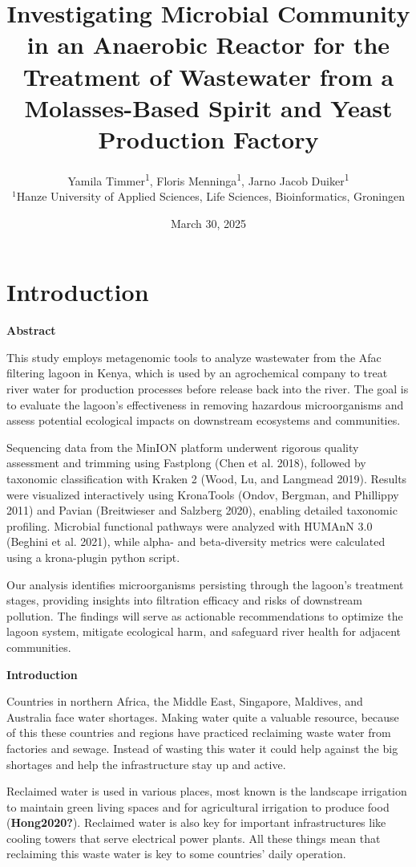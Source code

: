 \documentclass[
]{article}
\title{Investigating Microbial Community in an Anaerobic Reactor for the
Treatment of Wastewater from a Molasses-Based Spirit and Yeast
Production Factory}
\author{Yamila Timmer\textsuperscript{1}, Floris
Menninga\textsuperscript{1}, Jarno Jacob Duiker\textsuperscript{1}\\
\(^1\)Hanze University of Applied Sciences, Life Sciences,
Bioinformatics, Groningen}
\date{March 30, 2025}
\begin{document}
\maketitle

{
\setcounter{tocdepth}{2}
\tableofcontents
}
\hypertarget{introduction}{%
\section{Introduction}\label{introduction}}

\textbf{Abstract}

This study employs metagenomic tools to analyze wastewater from the Afac
filtering lagoon in Kenya, which is used by an agrochemical company to
treat river water for production processes before release back into the
river. The goal is to evaluate the lagoon's effectiveness in removing
hazardous microorganisms and assess potential ecological impacts on
downstream ecosystems and communities.

Sequencing data from the MinION platform underwent rigorous quality
assessment and trimming using Fastplong (Chen et al. 2018), followed by
taxonomic classification with Kraken 2 (Wood, Lu, and Langmead 2019).
Results were visualized interactively using KronaTools (Ondov, Bergman,
and Phillippy 2011) and Pavian (Breitwieser and Salzberg 2020), enabling
detailed taxonomic profiling. Microbial functional pathways were
analyzed with HUMAnN 3.0 (Beghini et al. 2021), while alpha- and
beta-diversity metrics were calculated using a krona-plugin python
script.

Our analysis identifies microorganisms persisting through the lagoon's
treatment stages, providing insights into filtration efficacy and risks
of downstream pollution. The findings will serve as actionable
recommendations to optimize the lagoon system, mitigate ecological harm,
and safeguard river health for adjacent communities.

\textbf{Introduction}

Countries in northern Africa, the Middle East, Singapore, Maldives, and
Australia face water shortages. Making water quite a valuable resource,
because of this these countries and regions have practiced reclaiming
waste water from factories and sewage. Instead of wasting this water it
could help against the big shortages and help the infrastructure stay up
and active.

Reclaimed water is used in various places, most known is the landscape
irrigation to maintain green living spaces and for agricultural
irrigation to produce food (\textbf{Hong2020?}). Reclaimed water is also
key for important infrastructures like cooling towers that serve
electrical power plants. All these things mean that reclaiming this
waste water is key to some countries' daily operation.
\end{document}
